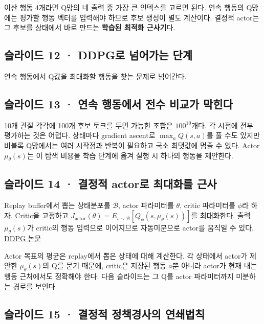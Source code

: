 \documentclass[11pt,a4paper]{article}
\begin{document}
이산 행동 4개라면 Q망의 네 출력 중 가장 큰 인덱스를 고르면 된다. 연속 행동의 Q망에는 평가할 행동 벡터를 입력해야 하므로 후보 생성이 별도 계산이다. 결정적 actor는 그 후보를 상태에서 바로 만드는 \textbf{학습된 최적화 근사기}다.\par

\subsection{슬라이드 12 · DDPG로 넘어가는 단계}

연속 행동에서 Q값을 최대화할 행동을 찾는 문제로 넘어간다.\par

\subsection{슬라이드 13 · 연속 행동에서 전수 비교가 막힌다}

10개 관절 각각에 100개 후보 토크를 두면 가능한 조합은 $100^{10}$개다. 각 시점에 전부 평가하는 것은 어렵다. 상태마다 gradient ascent로 $\max_aQ(s,a)$를 풀 수도 있지만 비볼록 Q망에서는 여러 시작점과 반복이 필요하고 국소 최댓값에 멈출 수 있다. Actor $\mu_\theta(s)$는 이 탐색 비용을 학습 단계에 옮겨 실행 시 하나의 행동을 제안한다.\par

\subsection{슬라이드 14 · 결정적 actor로 최대화를 근사}

Replay buffer에서 뽑는 상태분포를 $\mathcal B$, actor 파라미터를 $\theta$, critic 파라미터를 $\phi$라 하자. Critic을 고정하고 $J_{\mathrm{actor}}(\theta)=E_{s\sim\mathcal B}[Q_\phi(s,\mu_\theta(s))]$를 최대화한다. 출력 $\mu_\theta(s)$가 critic의 행동 입력으로 이어지므로 자동미분으로 actor를 움직일 수 있다. \href{https://arxiv.org/abs/1509.02971}{DDPG 논문}\par

Actor 목표의 평균은 replay에서 뽑은 상태에 대해 계산한다. 각 상태에서 actor가 제안한 $\mu_\theta(s)$의 Q를 묻기 때문에, critic은 저장된 행동 $a$뿐 아니라 actor가 현재 내는 행동 근처에서도 정확해야 한다. 다음 슬라이드는 그 Q를 actor 파라미터까지 미분하는 경로를 보인다.\par

\subsection{슬라이드 15 · 결정적 정책경사의 연쇄법칙}
\end{document}
